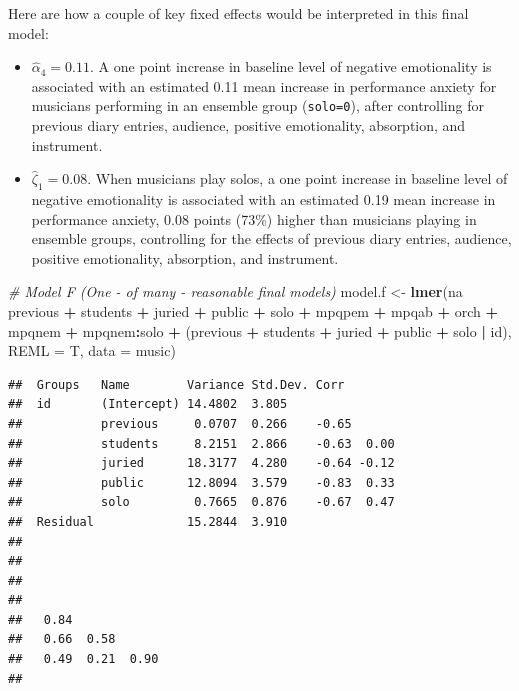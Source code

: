 \documentclass[
]{krantz}
\newenvironment{Shaded}{\begin{snugshade}}{\end{snugshade}}
\newcommand{\CommentTok}[1]{\textcolor[rgb]{0.37,0.37,0.37}{\textit{#1}}}
\newcommand{\DataTypeTok}[1]{\textcolor[rgb]{0.27,0.27,0.27}{#1}}
\newcommand{\KeywordTok}[1]{\textcolor[rgb]{0.27,0.27,0.27}{\textbf{#1}}}
\newcommand{\NormalTok}[1]{#1}
\newcommand{\OperatorTok}[1]{\textcolor[rgb]{0.43,0.43,0.43}{\textbf{#1}}}
\newcommand{\StringTok}[1]{\textcolor[rgb]{0.5,0.5,0.5}{#1}}
\providecommand{\tightlist}{%
  \setlength{\itemsep}{0pt}\setlength{\parskip}{0pt}}
\begin{document}
Here are how a couple of key fixed effects would be interpreted in this final model:

\begin{itemize}
\tightlist
\item
  \(\hat{\alpha}_{4} = 0.11\). A one point increase in baseline level of negative emotionality is associated with an estimated 0.11 mean increase in performance anxiety for musicians performing in an ensemble group (\texttt{solo=0}), after controlling for previous diary entries, audience, positive emotionality, absorption, and instrument.
\item
  \(\hat{\zeta}_{1} = 0.08\). When musicians play solos, a one point increase in baseline level of negative emotionality is associated with an estimated 0.19 mean increase in performance anxiety, 0.08 points (73\%) higher than musicians playing in ensemble groups, controlling for the effects of previous diary entries, audience, positive emotionality, absorption, and instrument.
\end{itemize}

\begin{Shaded}
\begin{Highlighting}[]
\CommentTok{# Model F (One - of many - reasonable final models)}
\NormalTok{model.f <-}\StringTok{ }\KeywordTok{lmer}\NormalTok{(na }\OperatorTok{~}\StringTok{ }\NormalTok{previous }\OperatorTok{+}\StringTok{ }\NormalTok{students }\OperatorTok{+}\StringTok{ }\NormalTok{juried }\OperatorTok{+}\StringTok{ }
\StringTok{    }\NormalTok{public }\OperatorTok{+}\StringTok{ }\NormalTok{solo }\OperatorTok{+}\StringTok{ }\NormalTok{mpqpem }\OperatorTok{+}\StringTok{ }\NormalTok{mpqab }\OperatorTok{+}\StringTok{ }\NormalTok{orch }\OperatorTok{+}\StringTok{ }\NormalTok{mpqnem }\OperatorTok{+}\StringTok{ }
\StringTok{    }\NormalTok{mpqnem}\OperatorTok{:}\NormalTok{solo }\OperatorTok{+}\StringTok{ }\NormalTok{(previous }\OperatorTok{+}\StringTok{ }\NormalTok{students }\OperatorTok{+}\StringTok{ }\NormalTok{juried }\OperatorTok{+}\StringTok{ }
\StringTok{    }\NormalTok{public }\OperatorTok{+}\StringTok{ }\NormalTok{solo }\OperatorTok{|}\StringTok{ }\NormalTok{id), }\DataTypeTok{REML =}\NormalTok{ T, }\DataTypeTok{data =}\NormalTok{ music)}
\end{Highlighting}
\end{Shaded}

\begin{verbatim}
##  Groups   Name        Variance Std.Dev. Corr       
##  id       (Intercept) 14.4802  3.805               
##           previous     0.0707  0.266    -0.65      
##           students     8.2151  2.866    -0.63  0.00
##           juried      18.3177  4.280    -0.64 -0.12
##           public      12.8094  3.579    -0.83  0.33
##           solo         0.7665  0.876    -0.67  0.47
##  Residual             15.2844  3.910               
##                   
##                   
##                   
##                   
##   0.84            
##   0.66  0.58      
##   0.49  0.21  0.90
## 
\end{verbatim}
\end{document}
